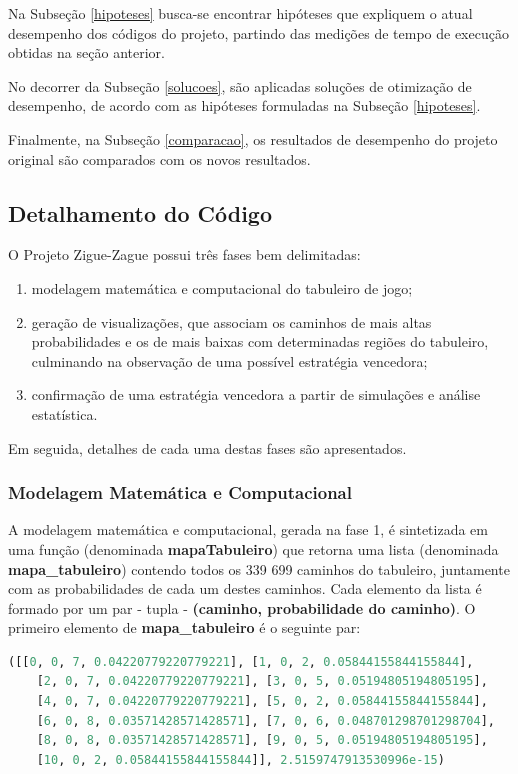 \documentclass[12pt]{article}
\begin{document}
Na Subseção \ref{hipoteses} busca-se encontrar hipóteses que expliquem o atual desempenho dos códigos do projeto, partindo das medições de tempo de execução obtidas na seção anterior.

No decorrer da Subseção \ref{solucoes}, são aplicadas soluções de otimização de desempenho, de acordo com as hipóteses formuladas na Subseção \ref{hipoteses}.

Finalmente, na Subseção \ref{comparacao}, os resultados de desempenho do projeto original são comparados com os novos resultados.

\subsection{Detalhamento do Código}
\label{detalhamento}

O Projeto Zigue-Zague possui três fases bem delimitadas: 

\begin{enumerate}
	\item modelagem matemática e computacional do tabuleiro de jogo; 
	\item geração de visualizações, que associam os caminhos de mais altas probabilidades e os de mais baixas com determinadas regiões do tabuleiro, culminando na observação de uma possível estratégia vencedora; 
	\item confirmação de uma estratégia vencedora a partir de simulações e análise estatística.
\end{enumerate} 

Em seguida, detalhes de cada uma destas fases são apresentados.

\subsubsection{Modelagem Matemática e Computacional}
\label{modelagem}

A modelagem matemática e computacional, gerada na fase 1, é sintetizada em uma função (denominada \textbf{mapaTabuleiro}) que retorna uma lista (denominada \textbf{mapa\_tabuleiro}) contendo todos os 339 699 caminhos do tabuleiro, juntamente com as probabilidades de cada um destes caminhos. Cada elemento da lista é formado por um par - tupla - \textbf{(caminho, probabilidade do caminho)}. O primeiro elemento de \textbf{mapa\_tabuleiro} é o seguinte par:

\begin{lstlisting}[language=Python]
([[0, 0, 7, 0.04220779220779221], [1, 0, 2, 0.05844155844155844], 
	[2, 0, 7, 0.04220779220779221], [3, 0, 5, 0.05194805194805195],
	[4, 0, 7, 0.04220779220779221], [5, 0, 2, 0.05844155844155844], 
	[6, 0, 8, 0.03571428571428571], [7, 0, 6, 0.048701298701298704], 
	[8, 0, 8, 0.03571428571428571], [9, 0, 5, 0.05194805194805195], 
	[10, 0, 2, 0.05844155844155844]], 2.5159747913530996e-15)
\end{lstlisting}
\end{document}

